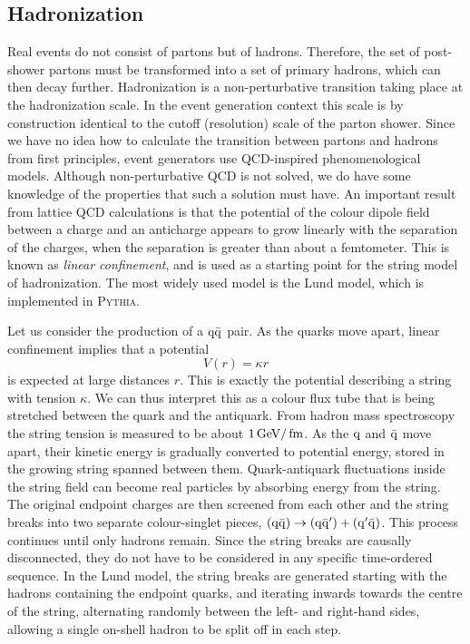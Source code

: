 \subsection{Hadronization \label{sec:event_hadronization}}

Real events do not consist of partons but of hadrons. Therefore, the set of post-shower partons
must be transformed into a set of primary hadrons, which can then decay further. 
Hadronization is a non-perturbative transition taking place at the hadronization scale. In the
event generation context this scale is by construction identical to the cutoff (resolution) scale of
the parton shower.
Since we have no idea how to calculate the transition between partons and hadrons from first
principles, event generators use QCD-inspired phenomenological models.
Although non-perturbative QCD is not solved, we do have some knowledge of the properties
that such a solution must have. 
An important result from lattice QCD calculations is that the potential of the colour dipole field
between a charge and an anticharge appears to grow linearly with the separation of the charges, when
the separation is greater than about a femtometer. This is known as \textit{linear confinement}, and
is used as a starting point for the string model of hadronization.
The most widely used model is the Lund model, which is implemented in \textsc{Pythia}.

Let us consider the production of a $\mathrm{q}\bar{\mathrm{q}}$ pair. As the quarks move apart,
linear confinement implies that a potential
\begin{equation}
  V(r) = \kappa r
\end{equation}
is expected at large distances $r$.  This is exactly the potential describing a
string with tension $\kappa$. We can thus interpret this as a colour flux tube that is being
stretched
between the quark and the antiquark. From hadron mass spectroscopy the string tension is
measured to be about $1\,\text{Ge\hspace{-.08em}V}/\text{\,fm}$.
As the $\mathrm{q}$ and $\bar{\mathrm{q}}$ move apart, their kinetic energy is gradually converted to potential
energy, stored in the growing string spanned between them. 
Quark-antiquark fluctuations inside the string field can become real particles by absorbing energy
from the string. The original endpoint charges are then screened from each other and the
string breaks into two separate colour-singlet pieces, $(\mathrm{q} \bar{\mathrm{q}}) \rightarrow (\mathrm{q}
\bar{\mathrm{q}}') + (\mathrm{q}' \bar{\mathrm{q}})$. This process continues until only hadrons remain.
Since the string breaks are causally disconnected, they do not have to be considered in any
specific time-ordered sequence. In the Lund model, the string breaks are generated starting
with the hadrons containing the endpoint quarks, and iterating inwards towards the centre of the
string, alternating randomly between the left- and right-hand sides, allowing a single on-shell
hadron to be split off in each step. 

